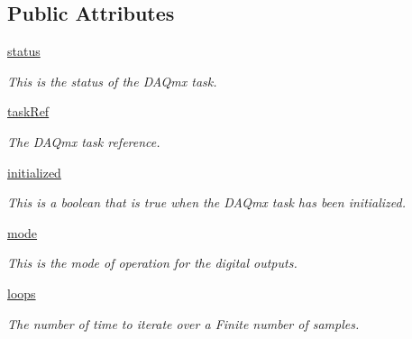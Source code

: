 \subsection*{Public Attributes}
\begin{DoxyCompactItemize}
\item 
\hyperlink{class_digital_output_1_1_digital_output_ad4c856a2b8d101078add570f1a5843a3}{status}
\begin{DoxyCompactList}\small\item\em This is the status of the D\-A\-Qmx task. \end{DoxyCompactList}\item 
\hyperlink{class_digital_output_1_1_digital_output_a2aeeacbf158f4acfdcb0461327396d98}{task\-Ref}
\begin{DoxyCompactList}\small\item\em The D\-A\-Qmx task reference. \end{DoxyCompactList}\item 
\hyperlink{class_digital_output_1_1_digital_output_af5c9fe7d592b5bcbd98ce90afc678fdc}{initialized}
\begin{DoxyCompactList}\small\item\em This is a boolean that is true when the D\-A\-Qmx task has been initialized. \end{DoxyCompactList}\item 
\hyperlink{class_digital_output_1_1_digital_output_a68b531bfedc4aa2fd7e54c24d2b9758e}{mode}
\begin{DoxyCompactList}\small\item\em This is the mode of operation for the digital outputs. \end{DoxyCompactList}\item 
\hyperlink{class_digital_output_1_1_digital_output_a352162e0da3e40979267c4263b726ead}{loops}
\begin{DoxyCompactList}\small\item\em The number of time to iterate over a Finite number of samples. \end{DoxyCompactList}\end{DoxyCompactItemize}
